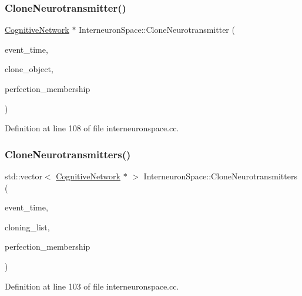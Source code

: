\subsubsection{\texorpdfstring{Clone\+Neurotransmitter()}{CloneNeurotransmitter()}}
{\footnotesize\ttfamily \mbox{\hyperlink{class_cognitive_network}{Cognitive\+Network}} $\ast$ Interneuron\+Space\+::\+Clone\+Neurotransmitter (\begin{DoxyParamCaption}\item[{std\+::chrono\+::time\+\_\+point$<$ \mbox{\hyperlink{universe_8h_a0ef8d951d1ca5ab3cfaf7ab4c7a6fd80}{Clock}} $>$}]{event\+\_\+time,  }\item[{\mbox{\hyperlink{class_cognitive_network}{Cognitive\+Network}} $\ast$}]{clone\+\_\+object,  }\item[{double}]{perfection\+\_\+membership }\end{DoxyParamCaption})}



Definition at line 108 of file interneuronspace.\+cc.

\mbox{\label{class_interneuron_space_a3defddf17eb839dbd799980f6116f895}} 
\subsubsection{\texorpdfstring{Clone\+Neurotransmitters()}{CloneNeurotransmitters()}}
{\footnotesize\ttfamily std\+::vector$<$ \mbox{\hyperlink{class_cognitive_network}{Cognitive\+Network}} $\ast$ $>$ Interneuron\+Space\+::\+Clone\+Neurotransmitters (\begin{DoxyParamCaption}\item[{std\+::chrono\+::time\+\_\+point$<$ \mbox{\hyperlink{universe_8h_a0ef8d951d1ca5ab3cfaf7ab4c7a6fd80}{Clock}} $>$}]{event\+\_\+time,  }\item[{std\+::vector$<$ \mbox{\hyperlink{class_cognitive_network}{Cognitive\+Network}} $\ast$$>$}]{cloning\+\_\+list,  }\item[{double}]{perfection\+\_\+membership }\end{DoxyParamCaption})}



Definition at line 103 of file interneuronspace.\+cc.

\mbox{\label{class_interneuron_space_a26d98a0ae78ce363ab93e92cf0c973e7}} 
